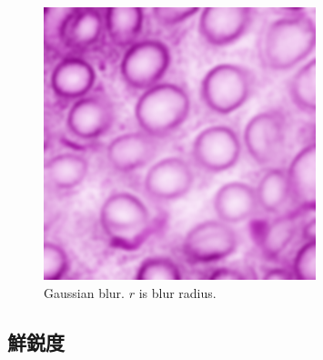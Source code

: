 \begin{figure}[H]
\begin{minipage}{0.24\columnwidth}
	\end{minipage}
	\begin{minipage}{0.24\columnwidth}
		\centering
		\includegraphics[clip, width=\linewidth]{fig/preprocessing/data_aug/color/blur/blur_2_00}
	\end{minipage}
	
	\caption{Gaussian blur. $r$ is blur radius.}
	\label{fig:ガウシアンブラー}

\end{figure}

\subsection*{鮮鋭度}

